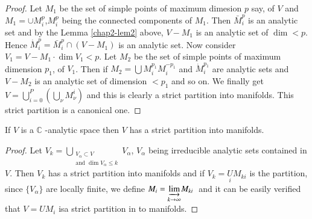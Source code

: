 \begin{proof} %
  Let $M_1$ be the  set of simple  points of maximum dimesion $p$ say,
  of $V$ and $M_1 = \cup M^{p}_{i}$,$ M^{p}_{i}$ being  the connected
  components of $M_1$. Then  $\bar{M}^{p}_{i}$ is an analytic  set and by the
  Lemma \ref{chap2-lem2} above, $V-M_1$ is an analytic set of $\dim < p$. Hence
  $\dot{M}^{p}_{i} = \bar{M}^{p}_{i} \cap (V-M_1)$ is  an analytic set. Now
  consider $V_1 = V-M_1\cdot \dim V_1 < p$. Let $M_2$ be the set  of
  simple  points of maximum dimension $p_1$, of  $V_1$. Then if
  $M_2 = \bigcup M^{p_{1}}_{i} M^{-p_{1}}_{i}$ and
  $\dot{M}^{p_{1}}_{i}$ are analytic sets and  $V-M_2$ is  an analytic
  set of dimension $< p_1$ and so on. We finally get $V= \bigcup
  \limits ^{P}_{i=0} (\underset{\nu}{\bigcup} M^{i}_{\nu}) $ and this
  is clearly a strict  partition  into  manifolds. This strict
  partition is a canonical one.  
\end{proof}

\setcounter{remark}{0}
\begin{remark}\label{chap2-rem1} %
  If $V$ is a  $ \mathbb{C} $ -analytic space then $V$ has a strict
  partition  into  manifolds. 
\end{remark}

\begin{proof} %
  Let $V _k = \bigcup\limits_{\substack{V_{\alpha}\subset V
      \\ \text{and }\dim V_{\alpha}\le k}} V_{\alpha}$,
  $V_{\alpha}$ being  irreducible  analytic sets contained in  $V$. Then
  $V_k$  has  a strict  partition into  manifolds and if $V_k=
  \underset{i}{U}M_{ki}$ is  the partition, since $\{ V_{\alpha}\}$
  are locally  finite, we define $M_i = \underset{k \to
    \infty}{\varinjlim} M_{ki}~$ and it can be easily verified that $V
  = U M_i$ is\pageoriginale a strict partition in to manifolds. 
\end{proof}

